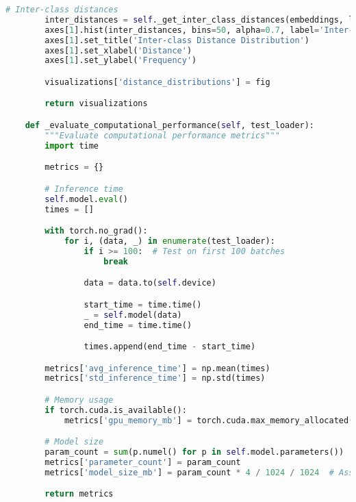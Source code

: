 \begin{lstlisting}[language=Python, caption=Comprehensive Evaluation Implementation]
        # Inter-class distances
        inter_distances = self._get_inter_class_distances(embeddings, labels)
        axes[1].hist(inter_distances, bins=50, alpha=0.7, label='Inter-class')
        axes[1].set_title('Inter-class Distance Distribution')
        axes[1].set_xlabel('Distance')
        axes[1].set_ylabel('Frequency')

        visualizations['distance_distributions'] = fig

        return visualizations

    def _evaluate_computational_performance(self, test_loader):
        """Evaluate computational performance metrics"""
        import time

        metrics = {}

        # Inference time
        self.model.eval()
        times = []

        with torch.no_grad():
            for i, (data, _) in enumerate(test_loader):
                if i >= 100:  # Test on first 100 batches
                    break

                data = data.to(self.device)

                start_time = time.time()
                _ = self.model(data)
                end_time = time.time()

                times.append(end_time - start_time)

        metrics['avg_inference_time'] = np.mean(times)
        metrics['std_inference_time'] = np.std(times)

        # Memory usage
        if torch.cuda.is_available():
            metrics['gpu_memory_mb'] = torch.cuda.max_memory_allocated() / 1024 / 1024

        # Model size
        param_count = sum(p.numel() for p in self.model.parameters())
        metrics['parameter_count'] = param_count
        metrics['model_size_mb'] = param_count * 4 / 1024 / 1024  # Assuming float32

        return metrics
\end{lstlisting}
